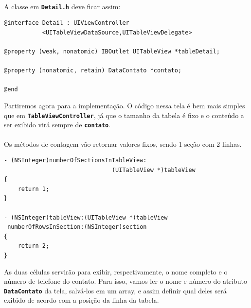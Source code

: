 \documentclass[a4paper,12pt,brazil,doubleside]{book}
\begin{document}
\paragraph{}A classe em \texttt{\textbf{Detail.h}} deve ficar assim:

\begin{listing}
\begin{verbatim}
@interface Detail : UIViewController
           <UITableViewDataSource,UITableViewDelegate>

@property (weak, nonatomic) IBOutlet UITableView *tableDetail;

@property (nonatomic, retain) DataContato *contato;

@end
\end{verbatim}
\end{listing}

Partiremos agora para a implementação. O código nessa tela é bem mais simples que em \texttt{\textbf{TableViewController}}, já que o tamanho da tabela é fixo e o conteúdo a ser exibido virá sempre de \texttt{\textbf{contato}}.

\pagebreak

\paragraph{}Os métodos de contagem vão retornar valores fixos, sendo 1 seção com 2 linhas.

\begin{listing}
\begin{verbatim}
- (NSInteger)numberOfSectionsInTableView:
                               (UITableView *)tableView
{        
    return 1;
}

- (NSInteger)tableView:(UITableView *)tableView
 numberOfRowsInSection:(NSInteger)section
{
    return 2;
}
\end{verbatim}
\end{listing}

As duas células servirão para exibir, respectivamente, o nome completo e o número de telefone do contato. Para isso, vamos ler o nome e número do atributo \texttt{\textbf{DataContato}} da tela, salvá-los em um array, e assim definir qual deles será exibido de acordo com a posição da linha da tabela.
\end{document}
